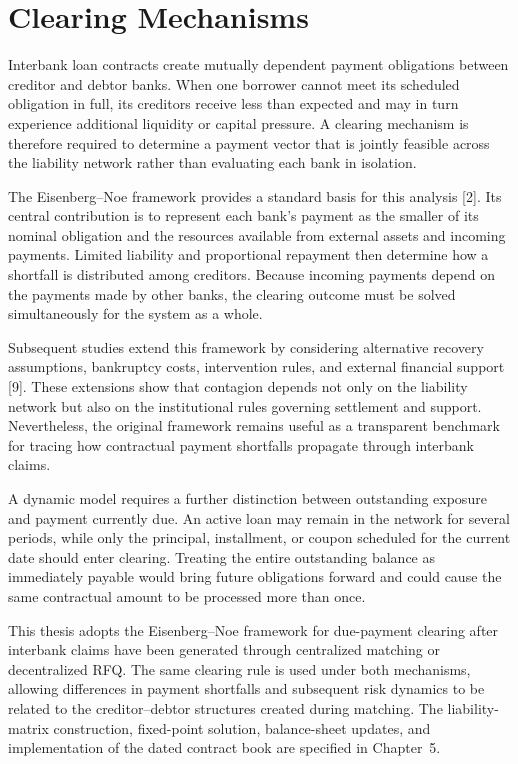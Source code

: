 \section{Clearing Mechanisms}

Interbank loan contracts create mutually dependent payment obligations
between creditor and debtor banks. When one borrower cannot meet its
scheduled obligation in full, its creditors receive less than expected
and may in turn experience additional liquidity or capital pressure. A
clearing mechanism is therefore required to determine a payment vector
that is jointly feasible across the liability network rather than
evaluating each bank in isolation.

The Eisenberg--Noe framework provides a standard basis for this analysis
{[}2{]}. Its central contribution is to represent each bank's payment as
the smaller of its nominal obligation and the resources available from
external assets and incoming payments. Limited liability and
proportional repayment then determine how a shortfall is distributed
among creditors. Because incoming payments depend on the payments made
by other banks, the clearing outcome must be solved simultaneously for
the system as a whole.

Subsequent studies extend this framework by considering alternative
recovery assumptions, bankruptcy costs, intervention rules, and external
financial support {[}9{]}. These extensions show that contagion depends
not only on the liability network but also on the institutional rules
governing settlement and support. Nevertheless, the original framework
remains useful as a transparent benchmark for tracing how contractual
payment shortfalls propagate through interbank claims.

A dynamic model requires a further distinction between outstanding
exposure and payment currently due. An active loan may remain in the
network for several periods, while only the principal, installment, or
coupon scheduled for the current date should enter clearing. Treating
the entire outstanding balance as immediately payable would bring future
obligations forward and could cause the same contractual amount to be
processed more than once.

This thesis adopts the Eisenberg--Noe framework for due-payment clearing
after interbank claims have been generated through centralized matching
or decentralized RFQ. The same clearing rule is used under both
mechanisms, allowing differences in payment shortfalls and subsequent
risk dynamics to be related to the creditor--debtor structures created
during matching. The liability-matrix construction, fixed-point
solution, balance-sheet updates, and implementation of the dated
contract book are specified in Chapter~5.

